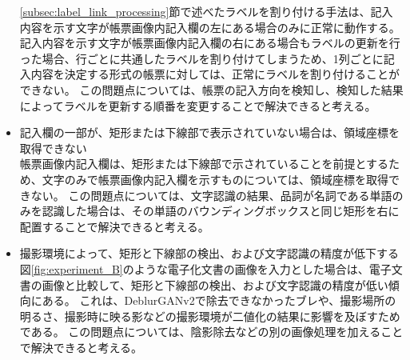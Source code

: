 \begin{itemize}
        \ref{subsec:label_link_processing}節で述べたラベルを割り付ける手法は、記入内容を示す文字が帳票画像内記入欄の左にある場合のみに正常に動作する。
        記入内容を示す文字が帳票画像内記入欄の右にある場合もラベルの更新を行った場合、行ごとに共通したラベルを割り付けてしまうため、1列ごとに記入内容を決定する形式の帳票に対しては、正常にラベルを割り付けることができない。
        この問題点については、帳票の記入方向を検知し、検知した結果によってラベルを更新する順番を変更することで解決できると考える。
    \item 記入欄の一部が、矩形または下線部で表示されていない場合は、領域座標を取得できない\\
        帳票画像内記入欄は、矩形または下線部で示されていることを前提とするため、文字のみで帳票画像内記入欄を示すものについては、領域座標を取得できない。
        この問題点については、文字認識の結果、品詞が名詞である単語のみを認識した場合は、その単語のバウンディングボックスと同じ矩形を右に配置することで解決できると考える。
    \item 撮影環境によって、矩形と下線部の検出、および文字認識の精度が低下する\\
        図\ref{fig:experiment_B}のような電子化文書の画像を入力とした場合は、電子文書の画像と比較して、矩形と下線部の検出、および文字認識の精度が低い傾向にある。
        これは、DeblurGANv2で除去できなかったブレや、撮影場所の明るさ、撮影時に映る影などの撮影環境が二値化の結果に影響を及ぼすためである。
        この問題点については、陰影除去などの別の画像処理を加えることで解決できると考える。
\end{itemize}